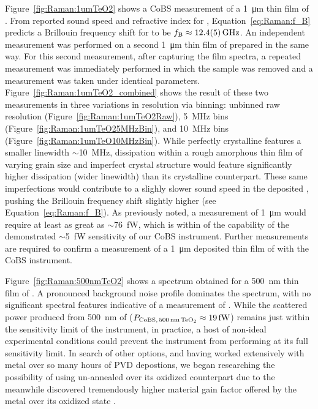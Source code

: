 Figure~\ref{fig:Raman:1umTeO2} shows a \ac{CoBS} measurement of a \SI{1}{\micro\meter} thin film of . From reported sound speed and refractive index for , \cite{uchida1969elastic, schweppe1970elastic, ohmachi1972acoustic, peercy1975temperature, fleury2018non, harris1991multichannel, uchida1971optical} Equation~\ref{eq:Raman:f_B} predicts a Brillouin frequency shift for  to be \(f_{\rm B}\approx\SI{12.4(0.5)}{\giga\hertz}\). An independent measurement was performed on a second \SI{1}{\micro\meter} thin film of  prepared in the same way. For this second measurement, after capturing the  film spectra, a repeated measurement was immediately performed in which the  sample was removed and a measurement was taken under identical parameters. Figure~\ref{fig:Raman:1umTeO2_combined} shows the result of these two measurements in three variations in resolution via binning: unbinned raw resolution (Figure~\ref{fig:Raman:1umTeO2Raw}), \SI{5}{\mega\hertz} bins (Figure~\ref{fig:Raman:1umTeO25MHzBin}), and \SI{10}{\mega\hertz} bins (Figure~\ref{fig:Raman:1umTeO10MHzBin}). While perfectly crystalline  features a smaller linewidth \(\sim\)\SI{10}{\mega\hertz}, \cite{renninger2018bulk} dissipation within a rough amorphous thin film of varying grain size and imperfect crystal structure would feature significantly higher dissipation (wider linewidth) than its crystalline counterpart. These same imperfections would contribute to a slighly slower sound speed in the deposited , pushing the Brillouin frequency shift slightly higher (see Equation~\ref{eq:Raman:f_B}). As previously noted, a measurement of \SI{1}{\micro\meter}  would require at least as great as \(\sim\)\SI{76}{\femto\watt}, which is within of the capability of the demonstrated \(\sim\)\SI{5}{\femto\watt} sensitivity of our \ac{CoBS} instrument. Further measurements are required to confirm a measurement of a \SI{1}{\micro\meter} deposited thin film of  with the \ac{CoBS} instrument.

Figure~\ref{fig:Raman:500nmTeO2} shows a spectrum obtained for a \SI{500}{\nano\meter} thin film of . A pronounced background noise profile dominates the spectrum, with no significant spectral features indicative of a measurement of . While the scattered power produced from \SI{500}{\nano\meter} of  (\(P_{\rm CoBS,\,\SI{500}{\nano\meter}\,\ce{TeO2}} \approx \SI{19}{\femto\watt}\)) remains just within the sensitivity limit of the instrument, in practice, a host of non-ideal experimental conditions could prevent the instrument from performing at its full sensitivity limit. In search of other options, and having worked extensively with  metal over so many hours of \ac{PVD} depostions, we began researching the possibility of using un-annealed  over its oxidized counterpart due to the meanwhile discovered tremendously higher material gain factor offered by  the metal over its oxidized state .

